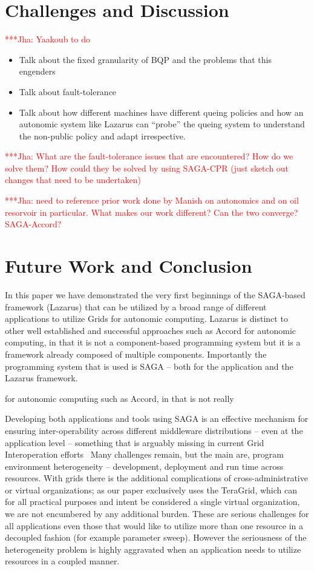 \documentclass[conference,final]{IEEEtran}
\newcommand{\jhanote}[1]{ {\textcolor{red} { ***Jha: #1 }}}
\begin{document}
\section{Challenges and Discussion}

\jhanote{Yaakoub to do}

\begin{itemize}
\item Talk about the fixed granularity of BQP and the problems that this
engenders
\item Talk about fault-tolerance
\item Talk about how different machines have different queing policies
  and how an autonomic system like Lazarus can ``probe'' the queing
  system to understand the non-public policy and adapt irrespective.
\end{itemize}


\jhanote{What are the fault-tolerance issues that are encountered?
  How do we solve them? How could they be solved by using SAGA-CPR
  (just sketch out changes that need to be undertaken)}

\jhanote{need to reference prior work done by Manish on autonomics and
  on oil resorvoir in particular. What makes our work different?  Can
  the two converge? SAGA-Accord?}

\section{Future Work and Conclusion}

In this paper we have demonstrated the very first beginnings of the
SAGA-based framework (Lazarus) that can be utilized by a broad range
of different applications to utilize Grids for autonomic computing.
Lazarus is distinct to other well established and successful
approaches such as Accord for autonomic computing, in that it is not a
component-based programming system but it is a framework already
composed of multiple components. Importantly the programming system
that is used is SAGA -- both for the application and the Lazarus
framework.

for autonomic computing such as Accord, in that is not really 



Developing both applications and tools using SAGA is an effective
mechanism for ensuring inter-operability across different middleware
distributions -- even at the application level -- something that is
arguably missing in current Grid Interoperation
efforts~\cite{gin_paper} Many challenges remain, but the main are,
program environment heterogeneity -- development, deployment and run
time across resources.  With grids there is the additional
complications of cross-administrative or virtual organizations; as our
paper exclusively uses the TeraGrid, which can for all practical
purposes and intent be considered a single virtual organization, we
are not encumbered by any additional burden. These are serious
challenges for all applications even those that would like to utilize
more than one resource in a decoupled fashion (for example parameter
sweep).  However the seriousness of the heterogeneity problem is
highly aggravated when an application needs to utilize resources in a
coupled manner.
\end{document}
